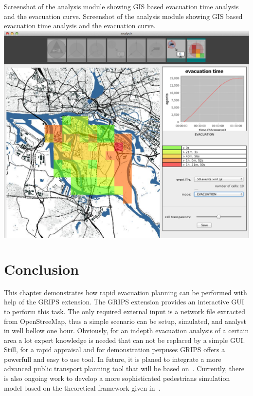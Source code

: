 \createfigure%
{Screenshot of the analysis module showing GIS based evacuation time analysis and the evacuation curve.}%
{Screenshot of the analysis module showing GIS based evacuation time analysis and the evacuation curve.}%
{\label{chap:evac:fig:analysis}}%
{\includegraphics[width=1\textwidth]{extending/figures/Evacuation/it50_evac_time}}
{}

\section{Conclusion}\label{grips:outlook}
This chapter demonstrates how rapid evacuation planning can be performed with help of the GRIPS extension. The GRIPS extension provides an interactive GUI to perform this task.
The only required external input is a network file extracted from OpenStreeMap, thus a simple scenario can be setup, simulated, and analyst in well bellow one hour. Obviously, for an indepth evacuation analysis of a certain area a lot expert knowledge is needed that can not be replaced by a simple GUI. Still, for a rapid appraisal and for demonstration perpuses GRIPS offers a powerfull and easy to use tool. 
In future, it is planed to integrate a more advanced public transport planning tool that will be based on~\cite{Neumann_PhDThesis_2014}.
Currently, there is also ongoing work to develop a more sophisticated pedestrians simulation model based on the theoretical framework given in~\cite{FloetteroedLaemmel2014BiPedFnd}.

